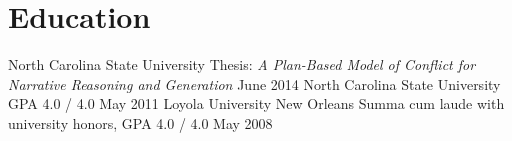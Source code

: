 \documentclass{cv}
\begin{document}

\section*{Education}
	{North Carolina State University}
	{Thesis: {\em A Plan-Based Model of Conflict for Narrative Reasoning and Generation}}
	{June 2014}
	{North Carolina State University}
	{GPA 4.0 / 4.0}
	{May 2011}
	{Loyola University New Orleans}
	{Summa cum laude with university honors, GPA 4.0 / 4.0}
	{May 2008}
	
\end{document}
